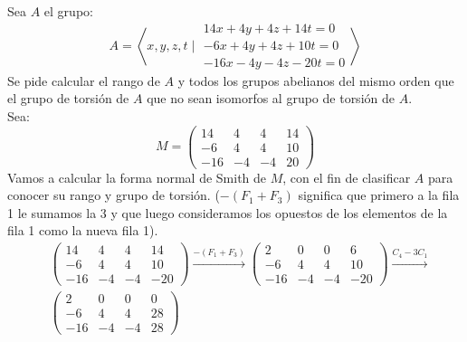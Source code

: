 \begin{ejemplo}
    Sea $A$ el grupo:
    \begin{equation*}
        A = \left\langle x,y,z,t \mid \begin{array}{r}
            14x + 4y + 4z + 14t = 0 \\
            -6x + 4y + 4z + 10t = 0 \\
            -16x- 4y - 4z - 20t = 0
        \end{array}\right\rangle 
    \end{equation*}
    Se pide calcular el rango de $A$ y todos los grupos abelianos del mismo orden que el grupo de torsión de $A$ que no sean isomorfos al grupo de torsión de $A$.\\

    \noindent
    Sea:
    \begin{equation*}
        M = \left(\begin{array}{cccc}
            14 & 4 & 4 & 14 \\
            -6 & 4 & 4 & 10 \\
            -16 & -4 & -4 & 20 
        \end{array}\right)
    \end{equation*}
    Vamos a calcular la forma normal de Smith de $M$, con el fin de clasificar $A$ para conocer su rango y grupo de torsión. ($-(F_1+F_3)$ significa que primero a la fila 1 le sumamos la 3 y que luego consideramos los opuestos de los elementos de la fila 1 como la nueva fila 1).
    \begin{align*}
        &\left(\begin{array}{cccc}
            14 & 4 & 4 & 14 \\
            -6 & 4 & 4 & 10 \\
            -16 & -4 & -4 & -20 
        \end{array}\right) 
        \xrightarrow{-(F_1+F_3)}
        \left(\begin{array}{cccc}
            2 & 0 & 0 & 6 \\
            -6 & 4 & 4 & 10 \\
            -16 & -4 & -4 & -20 
        \end{array}\right)  
        \xrightarrow{C_4-3C_1} \\
        &\left(\begin{array}{cccc}
            2 & 0 & 0 & 0 \\
            -6 & 4 & 4 & 28 \\
            -16 & -4 & -4 & 28
        \end{array}\right) 

\end{align*}
\end{ejemplo}
